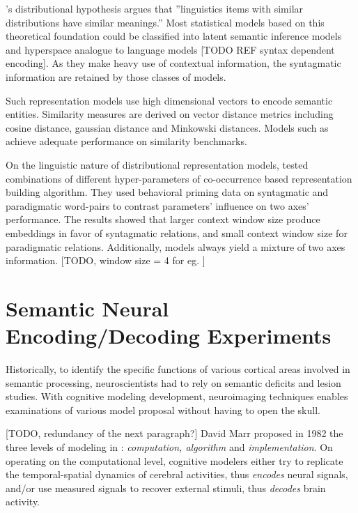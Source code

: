 \label{subsection:statisticalembedding}

\cite{harrisDistributionalStructure1954}'s distributional hypothesis argues that ''linguistics items with similar distributions have similar meanings.'' Most statistical models based on this theoretical foundation could be classified into latent semantic inference models \parencite{deerwesterUnitedStatesPatent1989, penningtonGloveGlobalVectors2014} and hyperspace analogue to language models \parencite{burgessHyperspaceAnalogueLanguage1995, mikolovLinguisticRegularitiesContinuous, }[TODO REF syntax dependent encoding]. As they make heavy use of contextual information, the syntagmatic information are retained by those classes of models.

Such representation models use high dimensional vectors to encode semantic entities. Similarity measures are derived on vector distance metrics including cosine distance, gaussian distance and Minkowski distances. Models such as \cite{penningtonGloveGlobalVectors2014, mikolovLinguisticRegularitiesContinuous} achieve adequate performance on similarity benchmarks. 

On the linguistic nature of distributional representation models, \cite{lapesaContrastingSyntagmaticParadigmatic2014} tested combinations of different hyper-parameters of co-occurrence based representation building algorithm. They used behavioral priming data on syntagmatic and paradigmatic word-pairs to contrast parameters' influence on two axes' performance. The results showed that larger context window size produce embeddings in favor of syntagmatic relations, and small context window size for paradigmatic relations. Additionally, models always yield a mixture of two axes information. [TODO, window size = 4 for eg. ]


\section{Semantic Neural Encoding/Decoding Experiments}

Historically, to identify the specific functions of various cortical areas involved in semantic processing, neuroscientists had to rely on semantic deficits and lesion studies. With cognitive modeling development, neuroimaging techniques enables examinations of various model proposal without having to open the skull. 

[TODO, redundancy of the next paragraph?]
David Marr proposed in 1982 the three levels of modeling in \parencite{marrVisionComputationalInvestigation1982}: \emph{computation, algorithm} and \emph{implementation}. On operating on the computational level, cognitive modelers either try to replicate the temporal-spatial dynamics of cerebral activities, thus \emph{encodes} neural signals, and/or use measured signals to recover external stimuli, thus \emph{decodes} brain activity. 

